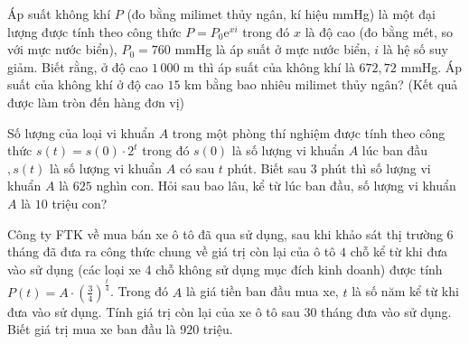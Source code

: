 \begin{ex}%
	Áp suất không khí $P$ (đo bằng milimet thủy ngân, kí hiệu mmHg) là một đại lượng được tính theo công thức $P=P_0\mathrm{e}^{xi}$ trong đó $x$ là độ cao (đo bằng mét, so với mực nước biển), $P_0=760$ mmHg là áp suất ở mực nước biển, $i$ là hệ số suy giảm. Biết rằng, ở độ cao $1\,000$ m thì áp suất của không khí là $672{,}72$ mmHg. Áp suất của không khí ở độ cao $15$ km bằng bao nhiêu milimet  thủy ngân? (Kết quả được làm tròn đến hàng đơn vị)
\end{ex}



\begin{bt}%
	Số lượng của loại vi khuẩn $A$ trong một phòng thí nghiệm được tính theo công thức $s(t)=s(0) \cdot 2^t$ trong đó $s(0)$ là số lượng vi khuẩn $A$ lúc ban đầu $,s(t)$ là số lượng vi khuẩn $A$ có sau $t$ phút. Biết sau $3$ phút thì số lượng vi khuẩn $A$ là $625$ nghìn con. Hỏi sau bao lâu, kể từ lúc ban đầu, số lượng vi khuẩn $A$  là $10$ triệu con?
\end{bt}

\begin{bt}%
	Công ty FTK về mua bán xe ô tô đã qua sử dụng, sau khi khảo sát thị trường $6$ tháng đã đưa ra công thức chung về giá trị còn lại của ô tô $4$ chỗ kể từ khi đưa vào sử dụng (các loại xe $4$ chỗ không sử dụng mục đích kinh doanh) được tính $P(t)=A\cdot\left(\frac{3}{4}\right)^\frac{t}{4}$. Trong đó $A$ là giá tiền ban đầu mua xe, $t$ là số năm kể từ khi đưa  vào sử dụng.
	Tính giá trị còn lại  của xe ô tô sau $30$ tháng đưa vào sử dụng. Biết giá trị mua xe ban đầu là $920$ triệu.
\end{bt}

